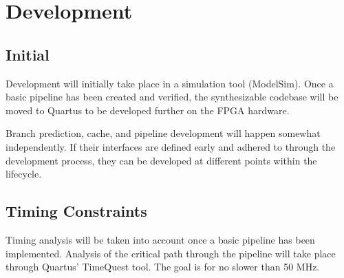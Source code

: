 \documentclass[11pt]{article}
\begin{document}
\section{Development}
\label{sec-5}
\subsection{Initial}
\label{sec-5-1}
Development will initially take place in a simulation tool (ModelSim). Once a basic pipeline has been created and verified, the synthesizable codebase will be moved to Quartus to be developed further on the FPGA hardware.

Branch prediction, cache, and pipeline development will happen somewhat independently. If their interfaces are defined early and adhered to through the development process, they can be developed at different points within the lifecycle.

\subsection{Timing Constraints}
\label{sec-5-2}
Timing analysis will be taken into account once a basic pipeline has been implemented. Analysis of the critical path through the pipeline will take place through Quartus' TimeQuest tool. The goal is for no slower than 50 MHz.
\end{document}
